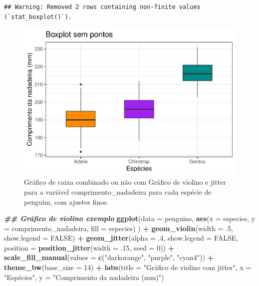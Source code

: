 \documentclass[
]{article}
\newenvironment{Shaded}{\begin{snugshade}}{\end{snugshade}}
\newcommand{\AttributeTok}[1]{\textcolor[rgb]{0.13,0.29,0.53}{#1}}
\newcommand{\ConstantTok}[1]{\textcolor[rgb]{0.56,0.35,0.01}{#1}}
\newcommand{\DecValTok}[1]{\textcolor[rgb]{0.00,0.00,0.81}{#1}}
\newcommand{\DocumentationTok}[1]{\textcolor[rgb]{0.56,0.35,0.01}{\textbf{\textit{#1}}}}
\newcommand{\FunctionTok}[1]{\textcolor[rgb]{0.13,0.29,0.53}{\textbf{#1}}}
\newcommand{\NormalTok}[1]{#1}
\newcommand{\SpecialCharTok}[1]{\textcolor[rgb]{0.81,0.36,0.00}{\textbf{#1}}}
\newcommand{\StringTok}[1]{\textcolor[rgb]{0.31,0.60,0.02}{#1}}
\begin{document}
\begin{verbatim}
## Warning: Removed 2 rows containing non-finite values (`stat_boxplot()`).
\end{verbatim}

\begin{figure}
\centering
\includegraphics{epr_files/figure-latex/fig-boxplot-violin-fino-1.pdf}
\caption{\label{fig:fig-boxplot-violin-fino-1}Gráfico de caixa combinado ou não com Gráfico de violino e jitter para a variável comprimento\_nadadeira para cada espécie de penguim, com ajustes finos.}
\end{figure}

\begin{Shaded}
\begin{Highlighting}[]
\DocumentationTok{\#\# Gráfico de violino exemplo}
\FunctionTok{ggplot}\NormalTok{(}\AttributeTok{data =}\NormalTok{ penguins, }
       \FunctionTok{aes}\NormalTok{(}\AttributeTok{x =}\NormalTok{ especies, }\AttributeTok{y =}\NormalTok{ comprimento\_nadadeira, }\AttributeTok{fill =}\NormalTok{ especies)}
\NormalTok{       ) }\SpecialCharTok{+}
    \FunctionTok{geom\_violin}\NormalTok{(}\AttributeTok{width =}\NormalTok{ .}\DecValTok{5}\NormalTok{, }\AttributeTok{show.legend =} \ConstantTok{FALSE}\NormalTok{) }\SpecialCharTok{+}
    \FunctionTok{geom\_jitter}\NormalTok{(}\AttributeTok{alpha =}\NormalTok{ .}\DecValTok{4}\NormalTok{, }\AttributeTok{show.legend =} \ConstantTok{FALSE}\NormalTok{, }
                \AttributeTok{position =} \FunctionTok{position\_jitter}\NormalTok{(}\AttributeTok{width =}\NormalTok{ .}\DecValTok{15}\NormalTok{, }\AttributeTok{seed =} \DecValTok{0}\NormalTok{)) }\SpecialCharTok{+}
    \FunctionTok{scale\_fill\_manual}\NormalTok{(}\AttributeTok{values =} \FunctionTok{c}\NormalTok{(}\StringTok{"darkorange"}\NormalTok{, }\StringTok{"purple"}\NormalTok{, }\StringTok{"cyan4"}\NormalTok{)) }\SpecialCharTok{+}
    \FunctionTok{theme\_bw}\NormalTok{(}\AttributeTok{base\_size =} \DecValTok{14}\NormalTok{) }\SpecialCharTok{+}
    \FunctionTok{labs}\NormalTok{(}\AttributeTok{title =} \StringTok{"Gráfico de violino com jitter"}\NormalTok{, }\AttributeTok{x =} \StringTok{"Espécies"}\NormalTok{, }\AttributeTok{y =} \StringTok{"Comprimento da nadadeira (mm)"}\NormalTok{)}
\end{Highlighting}
\end{Shaded}
\end{document}
